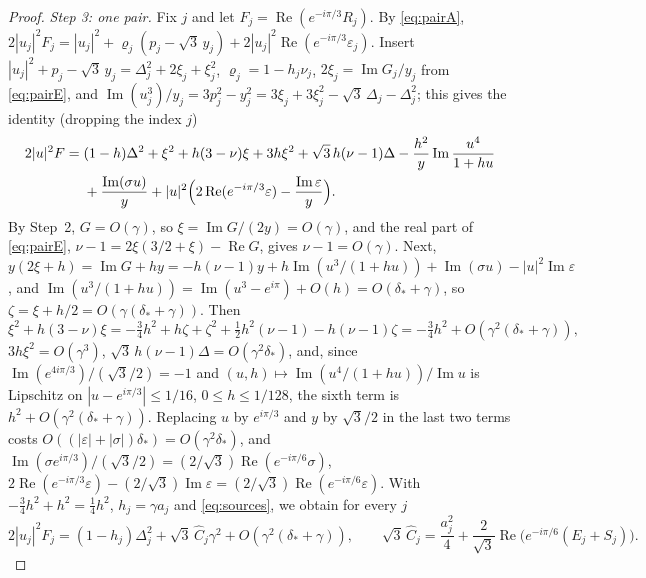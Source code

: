\documentclass[11pt]{article}
\theoremstyle{definition}
\newcommand{\re}{\operatorname{Re}}
\newcommand{\im}{\operatorname{Im}}
\begin{document}
\begin{proof}
\emph{Step 3: one pair.} Fix $j$ and let $F_j = \re(e^{-i\pi/3}R_j)$. By \eqref{eq:pairA}, $2|u_j|^2F_j = |u_j|^2 + \varrho_j(p_j - \sqrt{3}\,y_j) + 2|u_j|^2\re(e^{-i\pi/3}\varepsilon_j)$. Insert $|u_j|^2 + p_j - \sqrt{3}\,y_j = \Delta_j^2 + 2\xi_j + \xi_j^2$, $\varrho_j = 1 - h_j\nu_j$, $2\xi_j = \im G_j/y_j$ from \eqref{eq:pairE}, and $\im(u_j^3)/y_j = 3p_j^2 - y_j^2 = 3\xi_j + 3\xi_j^2 - \sqrt{3}\,\Delta_j - \Delta_j^2$; this gives the identity (dropping the index $j$)
\begin{equation}\label{eq:master}
\begin{split}
  2|u|^2F = {}& (1 - h)\Delta^2 + \xi^2 + h(3 - \nu)\xi + 3h\xi^2 + \sqrt{3}\,h(\nu - 1)\Delta - \frac{h^2}{y}\im\frac{u^4}{1 + hu}\\
  & + \frac{\im(\sigma u)}{y} + |u|^2\Bigl(2\re(e^{-i\pi/3}\varepsilon) - \frac{\im\varepsilon}{y}\Bigr).
\end{split}
\end{equation}
By Step~2, $G = O(\gamma)$, so $\xi = \im G/(2y) = O(\gamma)$, and the real part of \eqref{eq:pairE}, $\nu - 1 = 2\xi(3/2 + \xi) - \re G$, gives $\nu - 1 = O(\gamma)$. Next, $y(2\xi + h) = \im G + hy = -h(\nu - 1)y + h\im(u^3/(1 + hu)) + \im(\sigma u) - |u|^2\im\varepsilon$, and $\im(u^3/(1 + hu)) = \im(u^3 - e^{i\pi}) + O(h) = O(\delta_* + \gamma)$, so $\zeta = \xi + h/2 = O(\gamma(\delta_* + \gamma))$. Then
\[
  \xi^2 + h(3 - \nu)\xi = -\tfrac34 h^2 + h\zeta + \zeta^2 + \tfrac12 h^2(\nu - 1) - h(\nu - 1)\zeta = -\tfrac34 h^2 + O(\gamma^2(\delta_* + \gamma)),
\]
$3h\xi^2 = O(\gamma^3)$, $\sqrt{3}\,h(\nu - 1)\Delta = O(\gamma^2\delta_*)$, and, since $\im(e^{4i\pi/3})/(\sqrt{3}/2) = -1$ and $(u, h) \mapsto \im(u^4/(1 + hu))/\im u$ is Lipschitz on $|u - e^{i\pi/3}| \le 1/16$, $0 \le h \le 1/128$, the sixth term is $h^2 + O(\gamma^2(\delta_* + \gamma))$. Replacing $u$ by $e^{i\pi/3}$ and $y$ by $\sqrt{3}/2$ in the last two terms costs $O((|\varepsilon| + |\sigma|)\delta_*) = O(\gamma^2\delta_*)$, and $\im(\sigma e^{i\pi/3})/(\sqrt{3}/2) = (2/\sqrt{3})\re(e^{-i\pi/6}\sigma)$, $2\re(e^{-i\pi/3}\varepsilon) - (2/\sqrt{3})\im\varepsilon = (2/\sqrt{3})\re(e^{-i\pi/6}\varepsilon)$. With $-\frac34h^2 + h^2 = \frac14h^2$, $h_j = \gamma a_j$ and \eqref{eq:sources}, we obtain for every $j$
\begin{equation}\label{eq:pairexp}
  2|u_j|^2F_j = (1 - h_j)\Delta_j^2 + \sqrt{3}\,\widehat C_j\gamma^2 + O(\gamma^2(\delta_* + \gamma)), \qquad
  \sqrt{3}\,\widehat C_j = \frac{a_j^2}{4} + \frac{2}{\sqrt{3}}\re\bigl(e^{-i\pi/6}(E_j + S_j)\bigr).
\end{equation}


\end{proof}
\end{document}
